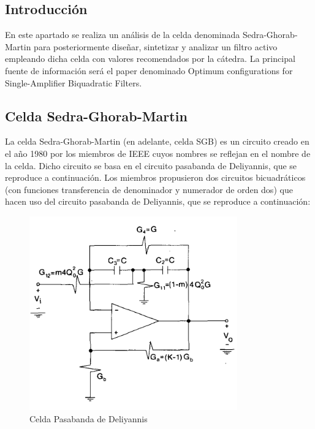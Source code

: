 \subsection{Introducción}

En este apartado se realiza un análisis de la celda denominada Sedra-Ghorab-Martin para posteriormente diseñar, sintetizar y analizar un filtro activo empleando dicha celda con valores recomendados por la cátedra. La principal fuente de información será el paper denominado Optimum configurations for Single-Amplifier Biquadratic Filters.

\subsection{Celda Sedra-Ghorab-Martin}

La celda Sedra-Ghorab-Martin (en adelante, celda SGB) es un circuito creado en el año 1980 por los miembros de IEEE cuyos nombres se reflejan en el nombre de la celda. Dicho circuito se basa en el circuito pasabanda de Deliyannis, que se reproduce a continuación. Los miembros propusieron dos circuitos bicuadráticos (con funciones transferencia de denominador y numerador de orden dos) que hacen uso del circuito pasabanda de Deliyannis, que se reproduce a continuación:

\begin{figure}[h]
	\includegraphics[width=0.8\textwidth]{../Ejercicio2-DisenoDeCeldas/3CeldaSedra/Imagenes/Celda Deliyannis.png}
	\centering
	\caption{Celda Pasabanda de Deliyannis}
	\label{Deliyannis pasabanda}
\end{figure}

